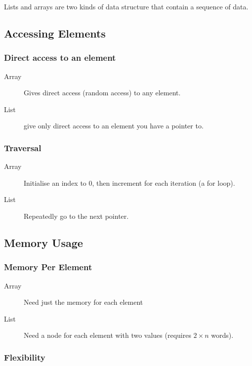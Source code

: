 Lists and arrays are two kinds of data structure that contain a sequence of data.

\subsection{Accessing Elements}\label{sub:accessing_elements}

\subsubsection{Direct access to an element}\label{ssub:direct_access_to_an_element}

\begin{description}
    \item[Array] Gives direct access (random access) to any element.
    \item[List] give only direct access to an element you have a pointer to.
\end{description}

\subsubsection{Traversal}\label{ssub:traversal}

\begin{description}
    \item[Array] Initialise an index to \(0\), then increment for each iteration (a for loop).
    \item[List] Repeatedly go to the next pointer.
\end{description}

\subsection{Memory Usage}\label{sub:memory_usage}

\subsubsection{Memory Per Element}\label{ssub:memory_per_element}

\begin{description}
    \item[Array] Need just the memory for each element
    \item[List] Need a node for each element with two values (requires \(2 \times n\) words).
\end{description}

\subsubsection{Flexibility}\label{ssub:flexibility}

